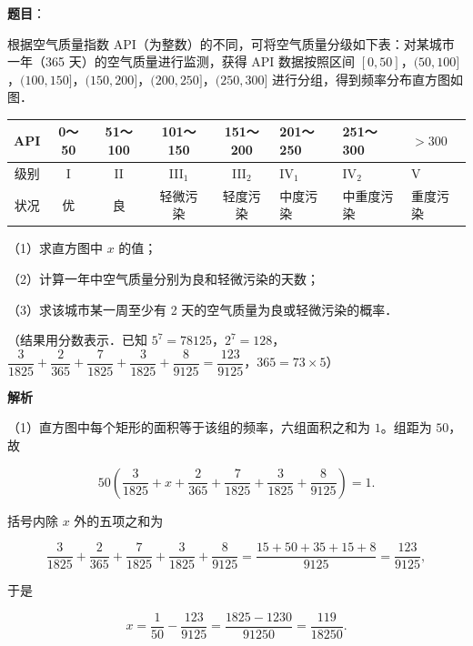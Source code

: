 \begin{answer}

\textbf{题目}：

根据空气质量指数 API（为整数）的不同，可将空气质量分级如下表：对某城市一年（365 天）的空气质量进行监测，获得 API 数据按照区间 $[0,50]$，$(50,100]$，$(100,150]$，$(150,200]$，$(200,250]$，$(250,300]$ 进行分组，得到频率分布直方图如图．

\begin{center}
\begingroup\setlength{\tabcolsep}{4pt}
\begin{tabular}{ccccclll}
\toprule
API & 0～50 & 51～100 & 101～150 & 151～200 & 201～250 & 251～300 & $>300$ \\
\midrule
级别 & I & II & III$_1$ & III$_2$ & IV$_1$ & IV$_2$ & V \\
状况 & 优 & 良 & 轻微污染 & 轻度污染 & 中度污染 & 中重度污染 & 重度污染 \\
\bottomrule
\end{tabular}
\endgroup
\end{center}

（1）求直方图中 $x$ 的值；

（2）计算一年中空气质量分别为良和轻微污染的天数；

（3）求该城市某一周至少有 2 天的空气质量为良或轻微污染的概率．

（结果用分数表示．已知 $5^7=78125$，$2^7=128$，$\dfrac{3}{1825}+\dfrac{2}{365}+\dfrac{7}{1825}+\dfrac{3}{1825}+\dfrac{8}{9125}=\dfrac{123}{9125}$，$365=73\times5$）
\nopagebreak[4]
\begin{center}\end{center}
\nopagebreak[4]
\textbf{解析}

（1）直方图中每个矩形的面积等于该组的频率，六组面积之和为 $1$。组距为 $50$，故

\nopagebreak[4]
\[50\left(\frac{3}{1825}+x+\frac{2}{365}+\frac{7}{1825}+\frac{3}{1825}+\frac{8}{9125}\right)=1.\]

括号内除 $x$ 外的五项之和为

\nopagebreak[4]
\[\frac{3}{1825}+\frac{2}{365}+\frac{7}{1825}+\frac{3}{1825}+\frac{8}{9125}=\frac{15+50+35+15+8}{9125}=\frac{123}{9125},\]

于是

\nopagebreak[4]
\[x=\frac1{50}-\frac{123}{9125}=\frac{1825-1230}{91250}=\frac{119}{18250}.\]


\end{answer}
